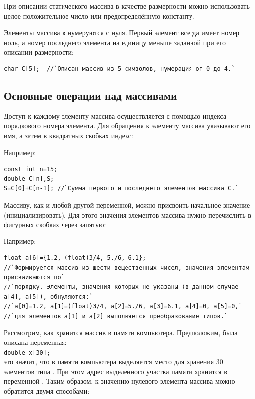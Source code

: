 При описании статического массива в качестве размерности можно использовать целое положительное число или
предопределённую константу.

Элементы массива в  нумеруются с нуля. Первый элемент всегда имеет номер ноль, а номер последнего элемента на
единицу меньше заданной при его описании размерности: 
\begin{lstlisting}
char C[5];  //`Описан массив из 5 символов, нумерация от 0 до 4.`
\end{lstlisting}

\subsection[Основные операции над массивами]{Основные операции над массивами}
Доступ к каждому элементу массива осуществляется с помощью индекса --- порядкового номера элемента. Для обращения к
элементу массива указывают его имя, а затем в квадратных скобках индекс:


Например:
\begin{lstlisting}
const int n=15; 
double C[n],S;
S=C[0]+C[n-1]; //`Сумма первого и последнего элементов массива С.`
\end{lstlisting}

Массиву, как и любой другой переменной, можно присвоить начальное значение (инициализировать). Для этого значения
элементов массива нужно перечислить в фигурных скобках через запятую:

{\small{}}

Например:
\begin{lstlisting}
float a[6]={1.2, (float)3/4, 5./6, 6.1}; 
//`Формируется массив из шести вещественных чисел, значения элементам присваиваются по`
//`порядку. Элементы, значения которых не указаны (в данном случае a[4], a[5]), обнуляются:`
//`a[0]=1.2, a[1]=(float)3/4, a[2]=5./6, a[3]=6.1, a[4]=0, a[5]=0,` 
//`для элементов a[1] и a[2] выполняется преобразование типов.`
\end{lstlisting}

Рассмотрим, как хранится массив в памяти компьютера. Предположим, была описана переменная:\\
\lstinline!double x[30];! \\
это значит, что в памяти компьютера выделяется место для хранения 30 элементов типа . При этом адрес
выделенного участка памяти хранится в переменной . Таким образом, к значению нулевого элемента массива 
можно обратится двумя способами:

